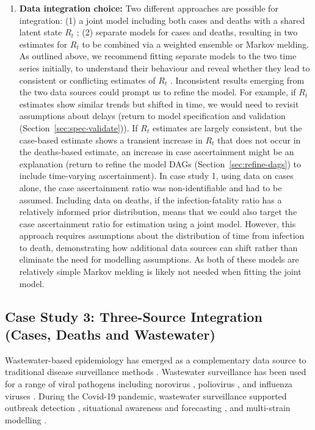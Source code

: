 \documentclass{article}
\begin{document}
\begin{enumerate}
    \item \textbf{Data integration choice:} 
       Two different approaches are possible for integration: (1) a joint model including both cases and deaths with a shared latent state $R_t$ \citep{scott2020epidemia}; (2) separate models for cases and deaths, resulting in two estimates for $R_t$ to be combined via a weighted ensemble or Markov melding.
        As outlined above, we recommend fitting separate models to the two time series initially, to understand their behaviour and reveal whether they lead to consistent or conflicting estimates of $R_t$ \citep{sherratt2021exploring}. Inconsistent results emerging from the two data sources could prompt us to refine the model. For example, if $R_t$ estimates show similar trends but shifted in time, we would need to revisit assumptions about delays (return to model specification and validation (Section~\ref{sec:spec-validate})). If $R_t$ estimates are largely consistent, but the case-based estimate shows a transient increase in $R_t$ that does not occur in the deaths-based estimate, an increase in case ascertainment might be an explanation (return to refine the model \ac{DAG}s (Section~\ref{sec:refine-dags}) to include time-varying ascertainment). In case study 1, using data on cases alone, the case ascertainment ratio was non-identifiable and had to be assumed. Including data on deaths, if the infection-fatality ratio has a relatively informed prior distribution, means that we could also target the case ascertainment ratio for estimation using a joint model. However, this approach requires assumptions about the distribution of time from infection to death, demonstrating how additional data sources can shift rather than eliminate the need for modelling assumptions. As both of these models are relatively simple Markov melding is likely not needed when fitting the joint model.
\end{enumerate}

\subsection{Case Study 3: Three-Source Integration (Cases, Deaths and Wastewater)}

Wastewater-based epidemiology has emerged as a complementary data source to traditional disease surveillance methods \citep{keshaviah2023wastewater}. Wastewater surveillance has been used for a range of viral pathogens including norovirus \citep{zheng2024tracking}, poliovirus \citep{whitehouse2024wastewater}, and influenza viruses \citep{zheng2023development}. During the Covid-19 pandemic, wastewater surveillance supported outbreak detection \citep{hewitt2022sensitivity}, situational awareness and forecasting \citep{varkila2023use,jin2024combining}, and multi-strain modelling \citep{dreifuss2025estimated}. 
\end{document}
